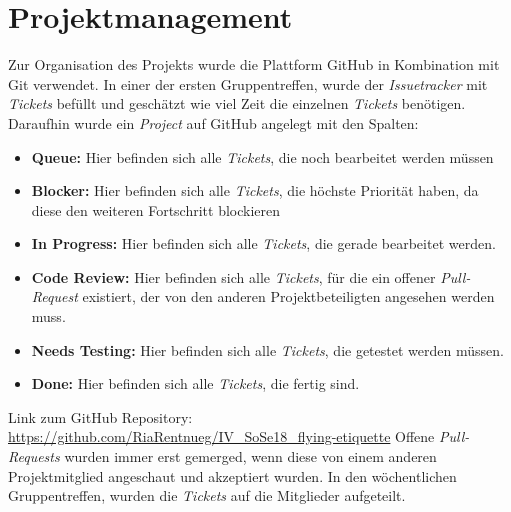 \documentclass{mi-seminar}
\begin{document}
\section{Projektmanagement}
Zur Organisation des Projekts wurde die Plattform GitHub in Kombination mit Git verwendet. In einer der ersten Gruppentreffen, wurde der \textit{Issuetracker} mit \textit{Tickets} befüllt und geschätzt wie viel Zeit die einzelnen \textit{Tickets} benötigen. 
Daraufhin wurde ein \textit{Project} auf GitHub angelegt mit den Spalten:
\begin{itemize}
\item \textbf{Queue: } Hier befinden sich alle \textit{Tickets}, die noch bearbeitet werden müssen
\item \textbf{Blocker: } Hier befinden sich alle \textit{Tickets}, die höchste Priorität haben, da diese den weiteren Fortschritt blockieren
\item \textbf{In Progress: } Hier befinden sich alle \textit{Tickets}, die gerade bearbeitet werden.
\item \textbf{Code Review: } Hier befinden sich alle \textit{Tickets}, für die ein offener \textit{Pull-Request} existiert, der von den anderen Projektbeteiligten angesehen werden muss.
\item \textbf{Needs Testing: } Hier befinden sich alle \textit{Tickets}, die getestet werden müssen.
\item \textbf{Done: } Hier befinden sich alle \textit{Tickets}, die fertig sind.
\newline \newline
\end{itemize}
Link zum GitHub Repository:\newline
\href{https://github.com/RiaRentnueg/IV_SoSe18_flying-etiquette}{https://github.com/RiaRentnueg/IV\_SoSe18\_flying-etiquette}
\linebreak \newline
Offene \textit{Pull-Requests} wurden immer erst gemerged, wenn diese von einem anderen Projektmitglied angeschaut und akzeptiert wurden. 
In den wöchentlichen Gruppentreffen, wurden die \textit{Tickets}
auf die Mitglieder aufgeteilt.
\end{document}
